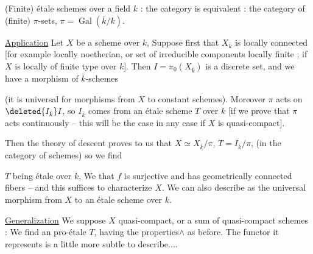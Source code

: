 (Finite) étale schemes over a field $k$ : the category is equivalent : the category of (finite) $\pi$-sets, $\pi=\operatorname{Gal}(\bar k/k)$.

\uline{Application} Let $X$ be a scheme over $k$, Suppose first that $X_{\bar k}$ is locally connected [for example locally noetherian, or set of irreducible components locally finite ;  if $X$ is locally of finite type over $k$]. Then $I=\pi_0(X_{\bar k})$ is a discrete set, and we have a  morphism of $\bar k$-schemes

(it is universal for morphisms from $X$ to constant schemes). Moreover $\pi$ acts on $\deleted{I_{\bar k}} I$, so $I_{\bar k}$ comes from an   étale scheme $T$ over $k$ [if we prove that $\pi$ acts continuously -- this will be the case in any case if $X$ is quasi-compact].


Then the theory of descent proves to us that $X\simeq X_{\bar k}/\pi$, $T=I_{\bar k}/\pi$, (in the category of schemes) so we find

$T$ being étale over $k$,  We  that $f$ is surjective and has geometrically connected fibers -- and this suffices to characterize $X$. We can also describe as the universal morphism from $X$ to an étale scheme over $k$.


\uline{Generalization} We suppose $X$ quasi-compact, or a sum of quasi-compact schemes : We find an  pro-étale $T$, having the  properties$\scriptscriptstyle\wedge$ as before. The functor it represents is a little more subtle to describe....

